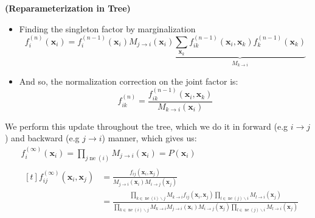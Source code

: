 \begin{remark}{\textbf{(Reparameterization in Tree)}}
\begin{itemize}
        \begin{equation*}
        \begin{aligned}
            p^{(n)}(\boldsymbol x_i, \boldsymbol x_k) &= \frac{1}{Z_{ik}^{(n)}} f^{(n)}_i(\boldsymbol x_i)f^{(n-1)}_{ik}(\boldsymbol x_i, \boldsymbol x_j) f^{(n-1)}_k(\boldsymbol x_j) \\
            &= \frac{1}{Z_{ik}^{(n)}} f^{(n-1)}_i(\boldsymbol x_i)M_{j\rightarrow i}(\boldsymbol x_i) f^{(n-1)}_{ik}(\boldsymbol x_i, \boldsymbol x_k) f^{(n-1)}_k(\boldsymbol x_k) \\
        \end{aligned}
        \end{equation*}
        \item Finding the singleton factor by marginalization
        \begin{equation*}
            f^{(n)}_i(\boldsymbol x_i) = f^{(n-1)}_i(\boldsymbol x_i)M_{j\rightarrow i}(\boldsymbol x_i) \underbrace{\sum_{\boldsymbol x_k}f^{(n-1)}_{ik}(\boldsymbol x_i, \boldsymbol x_k) f^{(n-1)}_k(\boldsymbol x_k)}_{M_{k\rightarrow i}}
        \end{equation*}
        \item And so, the normalization correction on the joint factor is:
        \begin{equation*}
            f^{(n)}_{ik} = \frac{f^{(n-1)}_{ik}(\boldsymbol x_i, \boldsymbol x_k)}{ M_{k\rightarrow i}(\boldsymbol x_i) }
        \end{equation*}
    \end{itemize}
    We perform this update throughout the tree, which we do it in forward (e.g $i\rightarrow j$) and backward (e.g $j\rightarrow i$) manner, which gives us:
    \begin{equation*}
    \begin{aligned}
        &f^{(\infty)}_i(\boldsymbol x_i) = \prod_{j\operatorname{ne}(i)}M_{j\rightarrow i}(\boldsymbol x_i) = P(\boldsymbol x_i) \\
        &\begin{aligned}[t]
            f^{(\infty)}_{ij}(\boldsymbol x_i, \boldsymbol x_j) &= \frac{f_{ij}(\boldsymbol x_i, \boldsymbol x_j)}{M_{j\rightarrow i}(\boldsymbol x_i)M_{i\rightarrow j}(\boldsymbol x_j)} \\
            &= \frac{\prod_{k \in \operatorname{ne}(i)\backslash j}M_{k\rightarrow i}f_{ij}(\boldsymbol x_i, \boldsymbol x_j)\prod_{l \in \operatorname{ne}(j)\backslash i}M_{l\rightarrow i}(\boldsymbol x_j)}{\prod_{k \in \operatorname{ne}(i)\backslash j}M_{k\rightarrow i} M_{j\rightarrow i}(\boldsymbol x_i)M_{i\rightarrow j}(\boldsymbol x_j) \prod_{l \in \operatorname{ne}(j)\backslash i}M_{l\rightarrow i}(\boldsymbol x_j) } \\

\end{aligned}
\end{aligned}
\end{equation*}
\end{remark}
